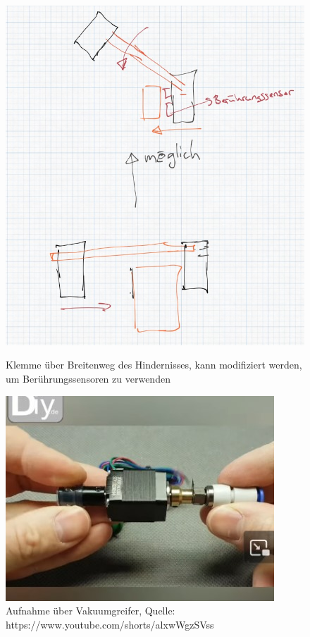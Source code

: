 \newpage
\begin{figure}[h!]
    \centering
    \begin{minipage}{0.45\textwidth}
        \centering
        \includegraphics[width=\textwidth]{img/technologierecherche/Aufnahme/Breiterweg_Griff.jpg}
        \caption{Klemme über Breitenweg des Hindernisses, kann modifiziert werden, um Berührungssensoren zu verwenden}
        \label{img:tech_Breiterweg_Griff}
    \end{minipage}
    \hfill
    \begin{minipage}{0.45\textwidth}
        \centering
        \includegraphics[width=\textwidth]{img/technologierecherche/Aufnahme/Vakuumgreifer.jpg}
        \caption{Aufnahme über Vakuumgreifer, Quelle: https://www.youtube.com/shorts/alxwWgzSVss} 
        \label{img:tech_Vakuumgreifer}
    \end{minipage}
\end{figure}

